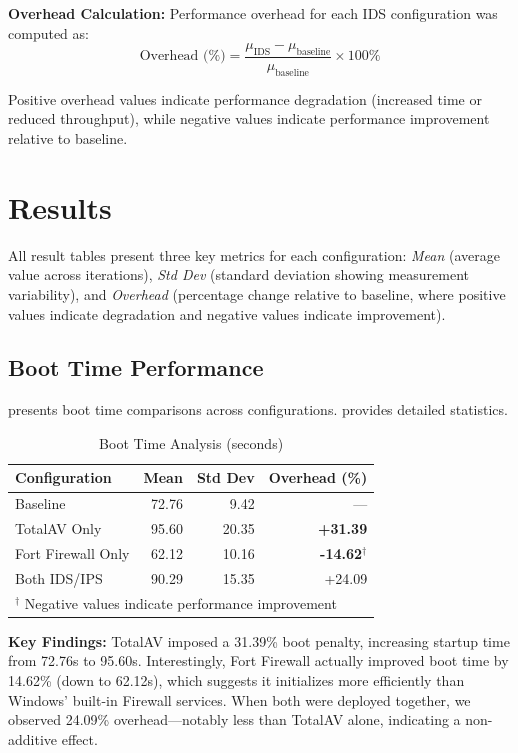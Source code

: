 \documentclass[runningheads,a4paper,english]{llncs}[2022/01/12]
\begin{document}
\textbf{Overhead Calculation:} Performance overhead for each IDS configuration was computed as:
\begin{equation}
\text{Overhead (\%)} = \frac{\mu_{\text{IDS}} - \mu_{\text{baseline}}}{\mu_{\text{baseline}}} \times 100\%
\end{equation}

Positive overhead values indicate performance degradation (increased time or reduced throughput), while negative values indicate performance improvement relative to baseline.

\section{Results}
\label{sec:results}

All result tables present three key metrics for each configuration: \textit{Mean} (average value across iterations), \textit{Std Dev} (standard deviation showing measurement variability), and \textit{Overhead} (percentage change relative to baseline, where positive values indicate degradation and negative values indicate improvement).

\subsection{Boot Time Performance}

 presents boot time comparisons across configurations.  provides detailed statistics.

\begin{table}[htbp]
\caption{Boot Time Analysis (seconds)}
\label{tab:boot_time}
\centering
\small
\begin{tabular}{@{}lrrr@{}}
\toprule
\textbf{Configuration} & \textbf{Mean} & \textbf{Std Dev} & \textbf{Overhead (\%)} \\
\midrule
Baseline & 72.76 & 9.42 & --- \\
TotalAV Only & 95.60 & 20.35 & \textbf{+31.39} \\
Fort Firewall Only & 62.12 & 10.16 & \textbf{-14.62}$^\dagger$ \\
Both IDS/IPS & 90.29 & 15.35 & +24.09 \\
\bottomrule
\multicolumn{4}{l}{\small $^\dagger$ Negative values indicate performance improvement}
\end{tabular}
\end{table}

\textbf{Key Findings:} TotalAV imposed a 31.39\% boot penalty, increasing startup time from 72.76s to 95.60s. Interestingly, Fort Firewall actually improved boot time by 14.62\% (down to 62.12s), which suggests it initializes more efficiently than Windows' built-in Firewall services. When both were deployed together, we observed 24.09\% overhead—notably less than TotalAV alone, indicating a non-additive effect.
\end{document}
